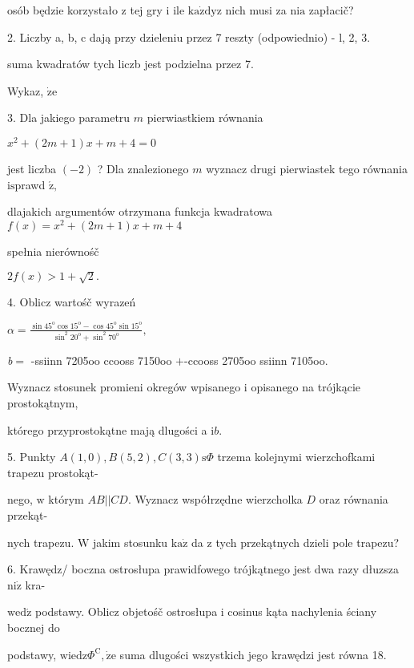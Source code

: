 \documentclass[a4paper,12pt]{article}
\begin{document}
osób będzie korzystało $\mathrm{z}$ tej gry $\mathrm{i}$ ile $\mathrm{k}\mathrm{a}\dot{\mathrm{z}}\mathrm{d}\mathrm{y}\mathrm{z}$ nich musi za $\mathrm{n}\mathrm{i}\mathrm{a}$ zapłacič?

2. Liczby a, b, c dają przy dzieleniu przez 7 reszty (odpowiednio) - l, 2, 3.

suma kwadratów tych liczb jest podzielna przez 7.

Wykaz, $\dot{\mathrm{z}}\mathrm{e}$

3. Dla jakiego parametru $m$ pierwiastkiem równania

$x^{2}+(2m+1)x+m+4=0$

jest liczba $(-2)$ ? Dla znalezionego $m$ wyznacz drugi pierwiastek tego równania $\mathrm{i}\mathrm{s}$prawd $\acute{\mathrm{z}},$

dlajakich argumentów otrzymana funkcja kwadratowa $f(x)=x^{2}+(2m+1)x+m+4$

spełnia nierównośč

$2f(x)>1+\sqrt{2}.$

4. Oblicz wartośč wyrazeń

$\displaystyle \alpha=\frac{\sin 45^{\mathrm{o}}\cos 15^{\mathrm{o}}-\cos 45^{\mathrm{o}}\sin 15^{\mathrm{o}}}{\sin^{2}20^{\mathrm{o}}+\sin^{2}70^{\mathrm{o}}},$

{\it b}$=$ -ssiinn 7205oo ccooss 7150oo $+$-ccooss 2705oo ssiinn 7105oo.

Wyznacz stosunek promieni okregów wpisanego $\mathrm{i}$ opisanego na trójkącie prostokątnym,

którego przyprostokątne mają dlugości a $\mathrm{i}b.$

5. Punkty $A(1,0), B(5,2), C(3,3) \mathrm{s}\Phi$ trzema kolejnymi wierzchofkami trapezu prostokąt-

nego, $\mathrm{w}$ którym $AB||CD$. Wyznacz współrzędne wierzcholka $D$ oraz równania przekąt-

nych trapezu. $\mathrm{W}$ jakim stosunku $\mathrm{k}\mathrm{a}\dot{\mathrm{z}}$ da $\mathrm{z}$ tych przekątnych dzieli pole trapezu?

6. Krawędz/ boczna ostrosłupa prawidfowego trójkątnego jest dwa razy dłuzsza $\mathrm{n}\mathrm{i}\dot{\mathrm{z}}$ kra-

$\mathrm{w}\mathrm{e}\mathrm{d}\acute{\mathrm{z}}$ podstawy. Oblicz objetośč ostrosłupa $\mathrm{i}$ cosinus kąta nachylenia ściany bocznej do

podstawy, $\mathrm{w}\mathrm{i}\mathrm{e}\mathrm{d}\mathrm{z}\Phi^{\mathrm{C}}, \dot{\mathrm{z}}\mathrm{e}$ suma dlugości wszystkich jego krawędzi jest równa 18.
\end{document}
